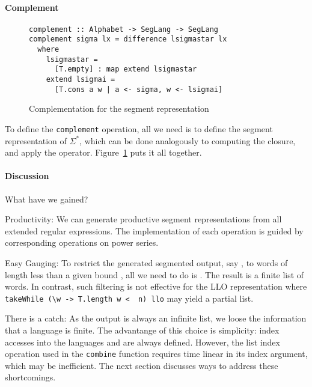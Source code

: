 \paragraph{Complement}
\begin{figure}[tp]
\begin{lstlisting}
complement :: Alphabet -> SegLang -> SegLang
complement sigma lx = difference lsigmastar lx
  where
    lsigmastar =
      [T.empty] : map extend lsigmastar
    extend lsigmai =
      [T.cons a w | a <- sigma, w <- lsigmai]
\end{lstlisting}
  \caption{Complementation for the segment representation}
  \label{fig:llo-complement}
\end{figure}
To define the \lstinline{complement} operation, all we need is to define the segment
representation of $\Sigma^*$, which can be done analogously to computing the closure, and
apply the  operator. Figure~\ref{fig:llo-complement} puts it all together.

\paragraph{Discussion}\label{sec:motivation-discussion}
What have we gained?

Productivity: We can generate productive segment
representations from all extended regular expressions. The implementation of each
operation is guided by corresponding operations on power series.

Easy Gauging: To restrict the generated segmented output, say , to words of
length less than a given 
bound , all we need to do is . The result is
a finite list of words. In contrast, such filtering is not effective
for the LLO representation where
\lstinline{takeWhile (\w -> T.length w <  n) llo} may yield a partial list.


There is a catch: As the output is always an infinite list, we loose the
information that a language is finite. The advantange of this choice is simplicity: index
accesses into the languages  and  are always defined. 
However, the list index operation used in the \lstinline{combine} function requires time
linear in its index argument, which may be inefficient.  
The next section discusses ways to address these shortcomings.

